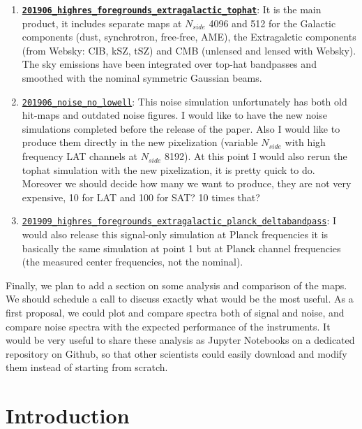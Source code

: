 \documentclass{article}
\begin{document}
\begin{enumerate}
\item \href{https://github.com/simonsobs/map_based_simulations/tree/master/201906_highres_foregrounds_extragalactic_tophat}{\textbf{\texttt{201906\_highres\_foregrounds\_extragalactic\_tophat}}}: It is the main product, it includes separate maps at $N_{side}$ 4096 and 512 for the Galactic components (dust, synchrotron, free-free, AME), the Extragalctic components (from Websky: CIB, kSZ, tSZ) and CMB (unlensed and lensed with Websky). The sky emissions have been integrated over top-hat bandpasses and smoothed with the nominal symmetric Gaussian beams.
\item \href{https://github.com/simonsobs/map_based_simulations/tree/master/201906_noise_no_lowell}{\texttt{201906\_noise\_no\_lowell}}:
  This noise simulation unfortunately     has both old hit-maps and outdated noise figures. I would like to have
  the new noise simulations completed before the release of the paper. Also I would like to produce them directly in the new pixelization (variable $N_{side}$ with high frequency LAT channels at $N_{side}$ 8192). At
  this point I would also rerun the tophat simulation with the   new pixelization, it is pretty quick to do. Moreover we should decide how many we want to produce, they are not very expensive, 10 for LAT and 100 for SAT? 10 times that?
\item \href{https://github.com/simonsobs/map_based_simulations/tree/master/201909_highres_foregrounds_extragalactic_planck_deltabandpass}{\texttt{201909\_highres\_foregrounds\_extragalactic\_planck\_deltabandpass}}:
  I would also release this signal-only simulation at Planck frequencies
  it is basically the same simulation at point 1 but at Planck channel frequencies (the measured center frequencies, not the nominal).
\end{enumerate}

Finally, we plan to add a section on some analysis and comparison of the maps. We should schedule a call to discuss exactly what would be the most useful. As a first proposal, we could plot and compare spectra both of signal and noise, and compare noise spectra with the expected performance of the instruments. It would be very useful to share these analysis as Jupyter Notebooks on a dedicated repository on Github, so that other scientists could easily download and modify them instead of starting from scratch.

\section{Introduction}
\end{document}
